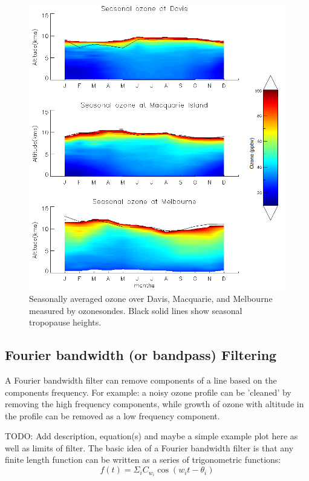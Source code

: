    \begin{figure}\begin{center}
      \includegraphics[width=0.8\columnwidth]{Figures/Ozone/seasonaltropozone.png}
      \caption{
	Seasonally averaged ozone over Davis, Macquarie, and Melbourne measured by ozonesondes.
	Black solid lines show seasonal tropopause heights.%
      }
      \label{ch_o3:fig:seasonaltropozone}
    \end{center}\end{figure}
    
  \subsection{Fourier bandwidth (or bandpass) Filtering}
    \label{ch_o3:sec:bandpassfilter}
    A Fourier bandwidth filter can remove components of a line based on the components frequency. 
    For example: a noisy ozone profile can be ’cleaned’ by removing the high frequency components, while growth of ozone with altitude in the profile can be removed as a low frequency component. 
    
    TODO: Add description, equation(s) and maybe a simple example plot here as well as limits of filter.
    The basic idea of a Fourier bandwidth filter is that any finite length function can be written as a series of trigonometric functions:
    \begin{equation} \label{ch_o3:eqn:FourierSeries}
      f(t) = \Sigma_i C_{w_i} \cos \left( w_i t - \theta_i \right)
    \end{equation}
    
